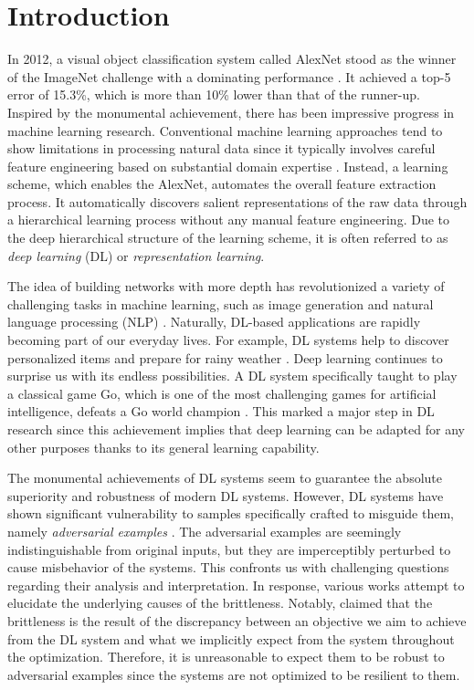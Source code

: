 \section{Introduction}
\label{sec:intro}

In 2012, a visual object classification system called AlexNet stood as the winner of the ImageNet challenge with a dominating performance \citep{AlexNet2012}. It achieved a top-5 error of 15.3\%, which is more than 10\% lower than that of the runner-up. Inspired by the monumental achievement, there has been impressive progress in machine learning research. Conventional machine learning approaches tend to show limitations in processing natural data since it typically involves careful feature engineering based on substantial domain expertise \citep{lecun2015deep}. Instead, a learning scheme, which enables the AlexNet, automates the overall feature extraction process. It automatically discovers salient representations of the raw data through a hierarchical learning process without any manual feature engineering. Due to the deep hierarchical structure of the learning scheme, it is often referred to as \textit{deep learning} (DL) or \textit{representation learning}.

The idea of building networks with more depth has revolutionized a variety of challenging tasks in machine learning, such as image generation \citep{rombach2021highresolution} and natural language processing (NLP) \citep{wei2022chain,wei2022finetuned}. Naturally, DL-based applications are rapidly becoming part of our everyday lives. For example, DL systems help to discover personalized items and prepare for rainy weather \citep{10.1145/3285029,Ravuri_2021}. Deep learning continues to surprise us with its endless possibilities. A DL system specifically taught to play a classical game Go, which is one of the most challenging games for artificial intelligence, defeats a Go world champion \citep{SilverHuangEtAl16nature}. This marked a major step in DL research since this achievement implies that deep learning can be adapted for any other purposes thanks to its general learning capability. 

The monumental achievements of DL systems seem to guarantee the absolute superiority and robustness of modern DL systems. However, DL systems have shown significant vulnerability to samples specifically crafted to misguide them, namely \textit{adversarial examples} \citep{Szegedy2014,goodfellow2015explaining,Dalvi04}. The adversarial examples are seemingly indistinguishable from original inputs, but they are imperceptibly perturbed to cause misbehavior of the systems. This confronts us with challenging questions regarding their analysis and interpretation. In response, various works attempt to elucidate the underlying causes of the brittleness. Notably, \citet{Ilyas2019} claimed that the brittleness is the result of the discrepancy between an objective we aim to achieve from the DL system and what we implicitly expect from the system throughout the optimization. Therefore, it is unreasonable to expect them to be robust to adversarial examples since the systems are not optimized to be resilient to them.

